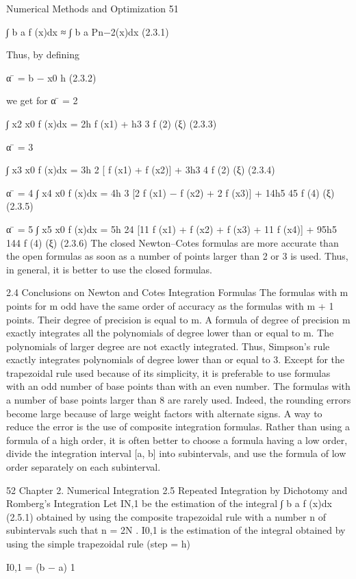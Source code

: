 \documentclass[letterpaper,12pt]{article}
\begin{document}
Numerical Methods and Optimization 51

∫ b
a
f (x)dx ≈
∫ b
a
Pn−2(x)dx (2.3.1)

Thus, by defining

α ̄ = b − x0
h (2.3.2)

we get
for α ̄ = 2

∫ x2
x0
f (x)dx = 2h f (x1) +
h3
3 f (2)
(ξ) (2.3.3)

α ̄ = 3

∫ x3
x0
f (x)dx = 3h
2 [ f (x1) + f (x2)] +
3h3
4 f (2)
(ξ) (2.3.4)

α ̄ = 4
∫ x4
x0
f (x)dx = 4h
3 [2 f (x1) − f (x2) + 2 f (x3)] +
14h5
45 f (4)
(ξ) (2.3.5)

α ̄ = 5
∫ x5
x0
f (x)dx = 5h
24 [11 f (x1) + f (x2) + f (x3) + 11 f (x4)] +
95h5
144 f (4)
(ξ) (2.3.6)
The closed Newton–Cotes formulas are more accurate than the open formulas as
soon as a number of points larger than 2 or 3 is used. Thus, in general, it is better to
use the closed formulas.

2.4 Conclusions on Newton and Cotes Integration Formulas
The formulas with m points for m odd have the same order of accuracy as the formulas
with m + 1 points. Their degree of precision is equal to m. A formula of degree
of precision m exactly integrates all the polynomials of degree lower than or equal
to m. The polynomials of larger degree are not exactly integrated. Thus, Simpson’s
rule exactly integrates polynomials of degree lower than or equal to 3. Except for the
trapezoidal rule used because of its simplicity, it is preferable to use formulas with an
odd number of base points than with an even number.
The formulas with a number of base points larger than 8 are rarely used. Indeed,
the rounding errors become large because of large weight factors with alternate signs.
A way to reduce the error is the use of composite integration formulas. Rather than
using a formula of a high order, it is often better to choose a formula having a low
order, divide the integration interval [a, b] into subintervals, and use the formula of
low order separately on each subinterval.

52 Chapter 2. Numerical Integration
2.5 Repeated Integration by Dichotomy and Romberg’s
Integration
Let IN,1 be the estimation of the integral
∫ b
a
f (x)dx (2.5.1)
obtained by using the composite trapezoidal rule with a number n of subintervals
such that n = 2N . I0,1 is the estimation of the integral obtained by using the simple
trapezoidal rule (step = h)

I0,1 = (b − a)
1
\end{document}
